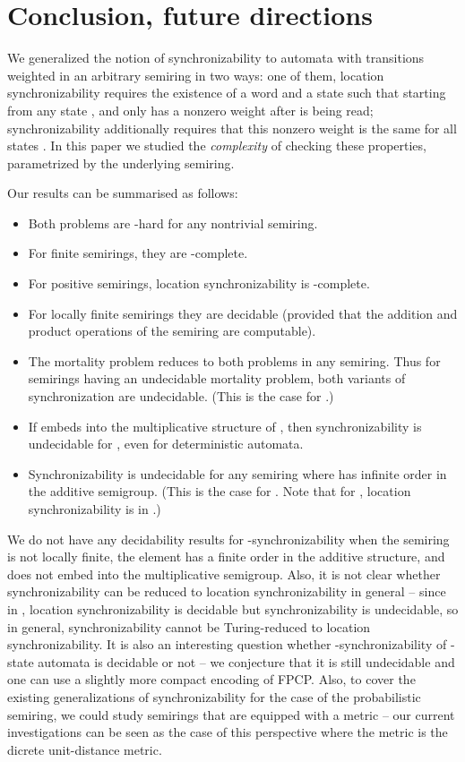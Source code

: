 \documentclass[submission,copyright,creativecommons]{eptcs}
\theoremstyle{plain}
\theoremstyle{definition}
\theoremstyle{remark}
\begin{document}
\section{Conclusion, future directions}
We generalized the notion of synchronizability to automata with transitions weighted in an arbitrary semiring in two ways:
one of them, location synchronizability requires the existence of a word  and a state  such that starting from any state ,
 and only  has a nonzero weight after  is being read; synchronizability additionally requires that this nonzero weight
is the same for all states . In this paper we studied the \emph{complexity} of checking these properties, parametrized by the underlying
semiring.

Our results can be summarised as follows:
\begin{itemize}
\item Both problems are -hard for any nontrivial semiring.
\item For finite semirings, they are -complete.
\item For positive semirings, location synchronizability is -complete.
\item For locally finite semirings they are decidable (provided that the addition and product operations of the semiring are computable).
\item The mortality problem reduces to both problems in any semiring. Thus for semirings having an undecidable mortality problem,
  both variants of synchronization are undecidable. (This is the case for .)
\item If  embeds into the multiplicative structure of , then synchronizability is undecidable
  for , even for deterministic automata.
\item Synchronizability is undecidable for any semiring where  has infinite order in the additive semigroup. (This is the case for .
  Note that for , location synchronizability is in .)
\end{itemize}
We do not have any decidability results for -synchronizability when the semiring  is not locally finite, the element  has a finite
order in the additive structure, and  does not embed into the multiplicative semigroup. Also, it is not clear whether synchronizability
can be reduced to location synchronizability in general -- since in , location synchronizability is decidable but synchronizability is
undecidable, so in general, synchronizability cannot be Turing-reduced to location synchronizability. It is also an interesting question whether
-synchronizability of -state automata is decidable or not -- we conjecture that it is still undecidable and one can use a slightly more compact
encoding of FPCP. Also, to cover the existing generalizations of synchronizability for the case of the probabilistic semiring,
we could study semirings that are equipped with a metric -- our current investigations can be seen as the case of this perspective
where the metric is the dicrete unit-distance metric.
\end{document}
